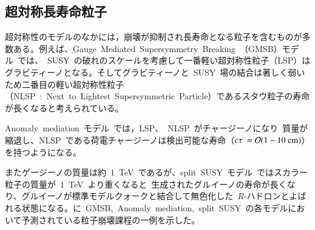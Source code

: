 \subsection{超対称長寿命粒子}
\label{subsec:LSP}
超対称性のモデルのなかには，崩壊が抑制され長寿命となる粒子を含むものが多数ある。例えば、Gauge~Mediated~Supersymmetry~Breaking~（GMSB）モデル~\cite{AR:12}では、~SUSY~の破れのスケールを考慮して一番軽い超対称性粒子（LSP）はグラビティーノとなる。そしてグラビティーノと~SUSY~場の結合は著しく弱いため二番目の軽い超対称性粒子（NLSP~:~Next~to~Lightest~Supersymmetric~Particle）であるスタウ粒子の寿命が長くなると考えられている。

Anomaly~mediation~モデル~\cite{AR:12}では，LSP、~NLSP~がチャージーノになり~質量が縮退し、NLSP~である荷電チャージーノは検出可能な寿命（$c\tau~=\mathcal{O}(1-10~\rm{cm})$）を持つようになる。

またゲージーノの質量は約~1~TeV~であるが、split~SUSY~モデル~\cite{AR:12}ではスカラー粒子の質量が~1~TeV~より重くなると~生成されたグルイーノの寿命が長くなり、グルイーノが標準モデルクォークと結合して無色化した~$R$-ハドロンとよばれる状態になる。に~GMSB,~Anomaly~mediation,~split~SUSY~の各モデルにおいて予測されている粒子崩壊課程の一例を示した。


